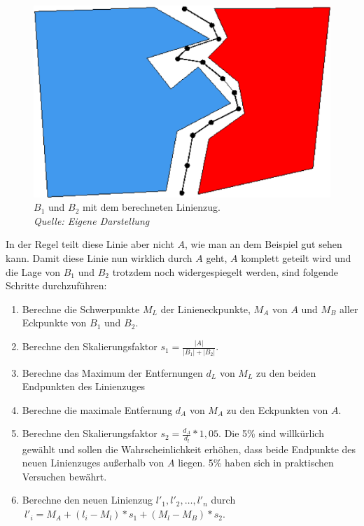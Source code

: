 \begin{figure}
	\centering
	\includegraphics[scale=0.4]{MittelpunktLinie.eps}
	\caption[Polygone mit dem berechneten Linienzug]{$B_1$ und $B_2$ mit dem berechneten Linienzug.\\\textit{Quelle: Eigene Darstellung}}
	\label{fig:MittelpunktLinie}
\end{figure}

In der Regel teilt diese Linie aber nicht $A$, wie man an dem Beispiel gut sehen kann. Damit diese Linie nun wirklich durch $A$ geht, $A$ komplett geteilt wird und die Lage von $B_1$ und $B_2$ trotzdem noch widergespiegelt werden, sind folgende Schritte durchzuführen:

\begin{enumerate}
\item Berechne die Schwerpunkte $M_L$ der Linieneckpunkte, $M_A$ von $A$ und $M_B$ aller Eckpunkte von $B_1$ und $B_2$.
\item Berechne den Skalierungsfaktor $s_1=\frac{|A|}{|B_1|+|B_2|}$. 
\item Berechne das Maximum der Entfernungen $d_L$ von $M_L$ zu den beiden Endpunkten des Linienzuges 
\item Berechne die maximale Entfernung $d_A$ von $M_A$ zu den Eckpunkten von $A$.
\item Berechne den Skalierungsfaktor $s_2=\frac{d_A}{d_l} * 1,05$. Die 5\% sind willkürlich gewählt und sollen die Wahrscheinlichkeit erhöhen, dass beide Endpunkte des neuen Linienzuges außerhalb von $A$ liegen. 5\% haben sich in praktischen Versuchen bewährt.
\item Berechne den neuen Linienzug $l'_1,l'_2,\hdots ,l'_n$ durch $\:l'_i=M_A+(l_i-M_l)*s_1+(M_l-M_B)*s_2$.
\end{enumerate}


